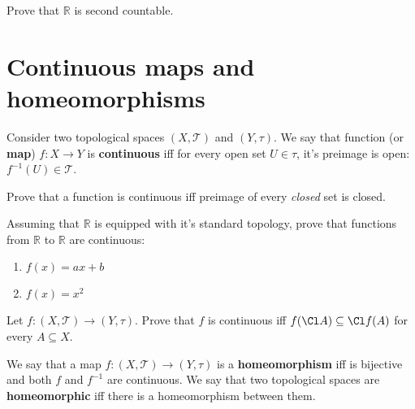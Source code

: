 \begin{prob}
  Prove that $\mathbb R$ is second countable.
\end{prob}

\section{Continuous maps and homeomorphisms}
Consider two topological spaces $(X,\mathcal T)$ and $(Y, \tau)$.
We say that function (or \textbf{map}) $f:X\to Y$ is \textbf{continuous} iff for every
open set $U\in \tau$, it's preimage is open: $f^{-1}(U)\in \mathcal T$.

\begin{prob}
  Prove that a function is continuous iff preimage of every \textit{closed} set is closed.
\end{prob}



\begin{prob}
  Assuming that $\mathbb R$ is equipped with it's standard topology,
  prove that functions from $\mathbb R$ to $\mathbb R$ are continuous:
  \begin{enumerate}
    \item $f(x)=ax+b$
    \item $f(x)=x^2$
  \end{enumerate}
\end{prob}

\begin{prob}
  Let $f: (X,\mathcal T)\to (Y, \tau)$. Prove that $f$ is continuous
  iff $f(\Cl A)\subseteq \Cl f(A)$ for every $A\subseteq X$.
\end{prob}

We say that a map $f: (X,\mathcal T)\to (Y, \tau)$ is a \textbf{homeomorphism} iff is bijective and both $f$ and $f^{-1}$ are continuous. We say that two topological spaces are \textbf{homeomorphic} iff there is a homeomorphism between them.

